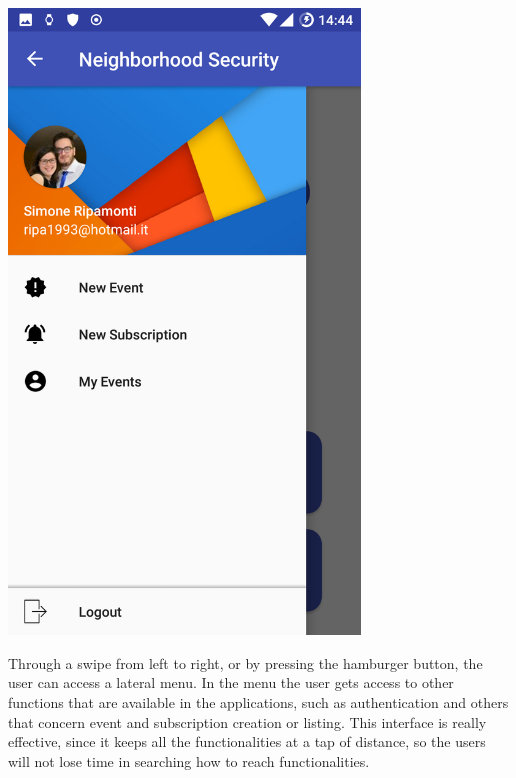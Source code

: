 \documentclass[a4paper]{scrreprt}
\begin{document}
\begin{minipage}{0.5\textwidth}
	\centering
	\includegraphics[width=0.7\textwidth]{imgs/home_drawer}
\end{minipage}
\begin{minipage}{0.5\textwidth}
	Through a swipe from left to right, or by pressing the hamburger button, the user can access a lateral menu. In the menu the user gets access to other functions that are available in the applications, such as authentication and others that concern event and subscription creation or listing. This interface is really effective, since it keeps all the functionalities at a tap of distance, so the users will not lose time in searching how to reach functionalities.
\end{minipage}
\end{document}
